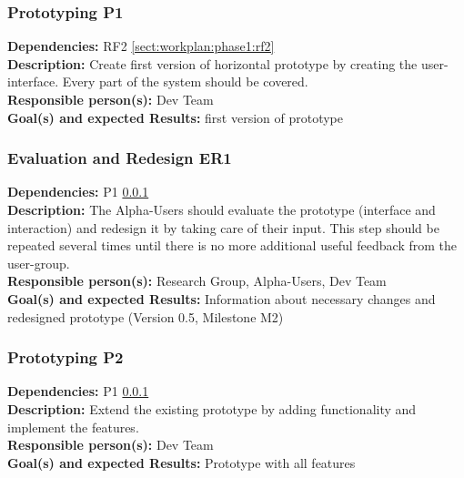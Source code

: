 \documentclass[a4paper,11pt]{article}
\begin{document}
\subsubsection{Prototyping P1}
\label{sect:workplan:phase2:p1}
\textbf{Dependencies:} RF2 \ref{sect:workplan:phase1:rf2}\\
\textbf{Description:} Create first version of horizontal prototype by creating the user-interface. Every part of the system should be covered.\\
\textbf{Responsible person(s):} Dev Team\\
\textbf{Goal(s) and expected Results:} first version of prototype\\

\subsubsection{Evaluation and Redesign ER1}
\label{sect:workplan:phase2:er1}
\textbf{Dependencies:} P1 \ref{sect:workplan:phase2:p1}\\
\textbf{Description:} The Alpha-Users should evaluate the prototype (interface and interaction) and redesign it by taking care of their input. This step should be repeated several times until there is no more additional useful feedback from the user-group.\\
\textbf{Responsible person(s):} Research Group, Alpha-Users, Dev Team\\
\textbf{Goal(s) and expected Results:} Information about necessary changes and redesigned prototype (Version 0.5, Milestone M2)\\

\subsubsection{Prototyping P2}
\label{sect:workplan:phase2:p2}
\textbf{Dependencies:} P1 \ref{sect:workplan:phase2:p1}\\
\textbf{Description:} Extend the existing prototype by adding functionality and implement the features.\\
\textbf{Responsible person(s):} Dev Team\\
\textbf{Goal(s) and expected Results:} Prototype with all features\\

\pagebreak
\end{document}
